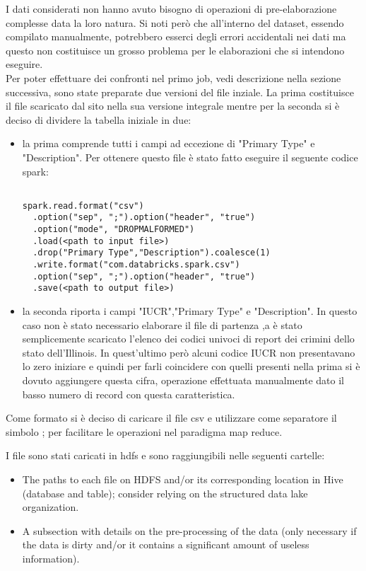 \documentclass[10pt]{article}
\begin{document}
I dati considerati non hanno avuto bisogno di operazioni di pre-elaborazione complesse data la loro natura. Si noti però che all'interno del dataset, essendo compilato manualmente, potrebbero esserci degli errori accidentali nei dati ma questo non costituisce un grosso problema per le elaborazioni che si intendono eseguire. \\

Per poter effettuare dei confronti nel primo job, vedi descrizione nella sezione successiva, sono state preparate due versioni del file inziale.
La prima costituisce il file scaricato dal sito nella sua versione integrale mentre per la seconda si è deciso di dividere la tabella iniziale in due:
\begin{itemize}
\item la prima comprende tutti i campi ad eccezione di "Primary Type" e "Description". Per ottenere questo file è stato fatto eseguire il seguente codice spark:
\begin{lstlisting}

spark.read.format("csv")
  .option("sep", ";").option("header", "true")
  .option("mode", "DROPMALFORMED")
  .load(<path to input file>)
  .drop("Primary Type","Description").coalesce(1)
  .write.format("com.databricks.spark.csv")
  .option("sep", ";").option("header", "true")
  .save(<path to output file>)

\end{lstlisting}

\item la seconda riporta i campi "IUCR","Primary Type" e "Description". In questo caso non è stato necessario elaborare il file di partenza ,a è stato semplicemente scaricato l'elenco dei codici univoci di report dei crimini dello stato dell'Illinois. In quest'ultimo però alcuni codice IUCR non presentavano lo zero iniziare e quindi per farli coincidere con quelli presenti nella prima si è dovuto aggiungere questa cifra, operazione effettuata manualmente dato il basso numero di record con questa caratteristica. 
\end{itemize}

Come formato si è deciso di caricare il file csv e utilizzare come separatore il simbolo ; per facilitare le operazioni nel paradigma map reduce.

I file sono stati caricati in hdfs e sono raggiungibili nelle seguenti cartelle:
\begin{itemize}
\item The paths to each file on HDFS and/or its corresponding location in Hive (database and table); consider relying on the structured data lake organization.
\item A subsection with details on the pre-processing of the data (only necessary if the data is dirty and/or it contains a significant amount of useless information).
\end{itemize}
\end{document}
